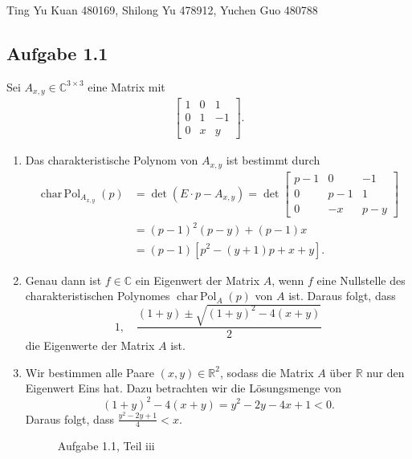 \documentclass[draft,a5paper]{article}
\theoremstyle{remark}
\DeclareMathOperator{\charPol}{char\,Pol}
\begin{document}
\maketitle
\begin{center}
  Ting Yu Kuan 480169, Shilong Yu 478912, Yuchen Guo 480788
\end{center}

\newpage
\subsection*{Aufgabe 1.1}
Sei \(A_{x, y} \in \mathbb{C}^{3\times3}\) eine Matrix mit
\begin{align*}
  \begin{bmatrix}
    1 & 0 & 1 \\
    0 & 1 & -1 \\
    0 & x & y
  \end{bmatrix}.
\end{align*}
\begin{enumerate}
\item Das charakteristische Polynom von \(A_{x,y}\) ist bestimmt durch
  \begin{align*}
    \charPol_{A_{x, y}}(p) &= \det(E \cdot p - A_{x, y}) = \det
    \begin{bmatrix}
      p - 1 & 0 & -1 \\
      0 & p - 1 & 1 \\
      0 & -x & p - y
    \end{bmatrix} \\
                           &= (p-1)^{2}(p-y) + (p-1)x \\
                           &= (p-1)[p^{2} - (y+1)p + x + y].
  \end{align*}
\item Genau dann ist \(f \in \mathbb{C}\) ein Eigenwert der Matrix \(A\), wenn \(f\)
  eine Nullstelle des charakteristischen Polynomes \(\charPol_{A}(p)\)
  von \(A\) ist.  Daraus folgt, dass
  \[1, \quad \frac{(1+y) \pm \sqrt{(1+y)^{2} - 4(x+y)}}{2}\]
  die Eigenwerte der Matrix \(A\) ist.
\item Wir bestimmen alle Paare \((x, y) \in \mathbb{R}^{2}\), sodass die Matrix \(A\)
  über \(\mathbb{R}\) nur den Eigenwert Eins hat.  Dazu betrachten wir die
  Lösungsmenge von
  \[(1+y)^{2} - 4(x+y) = y^{2} - 2y - 4x + 1 < 0.\]
  Daraus folgt, dass
  \(\frac{y^{2} - 2y + 1}{4} < x\).
  \begin{figure}[ht]
    \centering
    \caption{Aufgabe 1.1, Teil iii}
  \end{figure}
\end{enumerate}
\end{document}
